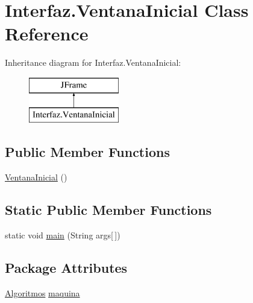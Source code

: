 \hypertarget{class_interfaz_1_1_ventana_inicial}{}\section{Interfaz.\+Ventana\+Inicial Class Reference}
\label{class_interfaz_1_1_ventana_inicial}
Inheritance diagram for Interfaz.\+Ventana\+Inicial\+:\begin{figure}[H]
\begin{center}
\leavevmode
\includegraphics[height=2.000000cm]{class_interfaz_1_1_ventana_inicial}
\end{center}
\end{figure}
\subsection*{Public Member Functions}
\begin{DoxyCompactItemize}
\item 
\mbox{\hyperlink{class_interfaz_1_1_ventana_inicial_a9e19b8b8cd08845d7b65b8f5f8b99d1e}{Ventana\+Inicial}} ()
\end{DoxyCompactItemize}
\subsection*{Static Public Member Functions}
\begin{DoxyCompactItemize}
\item 
static void \mbox{\hyperlink{class_interfaz_1_1_ventana_inicial_a19f3f67512433e3d4612705cc49430ad}{main}} (String args\mbox{[}$\,$\mbox{]})
\end{DoxyCompactItemize}
\subsection*{Package Attributes}
\begin{DoxyCompactItemize}
\item 
\mbox{\hyperlink{classalgoritmia2_1_1_algoritmos}{Algoritmos}} \mbox{\hyperlink{class_interfaz_1_1_ventana_inicial_a906577f94c1548333c5f598012939378}{maquina}}
\end{DoxyCompactItemize}
